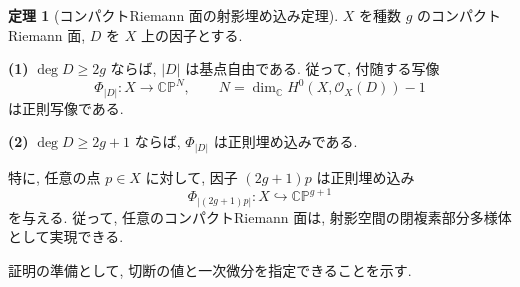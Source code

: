\documentclass[dvipdfmx,a4paper,11pt]{article} %
\newcommand{\C}{\mathbb{C}}
\theoremstyle{definition}
\newtheorem{thm}{定理}[section]
\numberwithin{equation}{section}
\begin{document}
\begin{thm}[コンパクトRiemann 面の射影埋め込み定理]
\label{O-M333}
$X$ を種数 $g$ のコンパクトRiemann 面, 
$D$ を $X$ 上の因子とする.

\medskip
\noindent
\textbf{(1)}
$\deg D\geq2g$ ならば, $|D|$ は基点自由である.
従って, 付随する写像
\[
\Phi_{|D|}:X\longrightarrow\C\mathbb P^N,
\qquad
N=\dim_{\mathbb C}H^0(X,\mathcal O_X(D))-1
\]
は正則写像である.

\medskip
\noindent
\textbf{(2)}
$\deg D\geq2g+1$ ならば, $\Phi_{|D|}$ は正則埋め込みである.

特に, 任意の点 $p\in X$ に対して, 
因子 $(2g+1)p$ は正則埋め込み
\[
\Phi_{|(2g+1)p|}:X\hookrightarrow\C\mathbb P^{g+1}
\]
を与える.
従って, 任意のコンパクトRiemann 面は, 
射影空間の閉複素部分多様体として実現できる.
\end{thm}

証明の準備として, 切断の値と一次微分を指定できることを示す.
\end{document}
